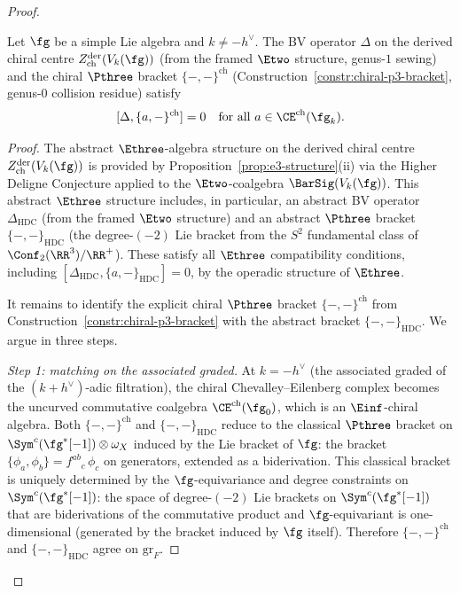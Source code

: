 \begin{proof}
\begin{lemma}
\label{lem:bv-p3-commutativity}
Let $\fg$ be a simple Lie algebra and $k \neq -h^\vee$.
The BV operator $\Delta$ on the derived chiral centre
$Z^{\mathrm{der}}_{\mathrm{ch}}(V_k(\fg))$
\textup{(}from the framed $\Etwo$ structure,
genus-$1$ sewing\textup{)} and the chiral $\Pthree$
bracket $\{-,-\}^{\mathrm{ch}}$
\textup{(}Construction~\textup{\ref{constr:chiral-p3-bracket}},
genus-$0$ collision residue\textup{)} satisfy
\begin{equation}\label{eq:bv-p3-commute}
  [\Delta, \{a,-\}^{\mathrm{ch}}] = 0
  \quad \text{for all } a \in \CE^{\mathrm{ch}}(\fg_k).
\end{equation}
\end{lemma}

\begin{proof}
The abstract $\Ethree$-algebra structure on the derived
chiral centre $Z^{\mathrm{der}}_{\mathrm{ch}}(V_k(\fg))$
is provided by Proposition~\ref{prop:e3-structure}(ii)
via the Higher Deligne Conjecture applied to the
$\Etwo$-coalgebra $\BarSig(V_k(\fg))$.
This abstract $\Ethree$ structure includes, in particular,
an abstract BV operator $\Delta_{\mathrm{HDC}}$
(from the framed $\Etwo$ structure) and an abstract
$\Pthree$ bracket $\{-,-\}_{\mathrm{HDC}}$
(the degree-$(-2)$ Lie bracket from the $S^2$ fundamental
class of $\Conf_2(\RR^3)/\RR^+$). These satisfy all
$\Ethree$ compatibility conditions, including
$[\Delta_{\mathrm{HDC}}, \{a, -\}_{\mathrm{HDC}}] = 0$,
by the operadic structure of $\Ethree$.

It remains to identify the explicit chiral $\Pthree$
bracket $\{-,-\}^{\mathrm{ch}}$ from
Construction~\ref{constr:chiral-p3-bracket} with
the abstract bracket $\{-,-\}_{\mathrm{HDC}}$. We argue
in three steps.

\textit{Step 1: matching on the associated graded.}
At $k = -h^\vee$ (the associated graded of the
$(k+h^\vee)$-adic filtration), the chiral
Chevalley--Eilenberg complex becomes the uncurved
commutative coalgebra $\CE^{\mathrm{ch}}(\fg_0)$,
which is an $\Einf$-chiral algebra.
Both $\{-,-\}^{\mathrm{ch}}$ and $\{-,-\}_{\mathrm{HDC}}$
reduce to the classical $\Pthree$ bracket on
$\Sym^c(\fg^*[-1]) \otimes \omega_X$ induced by the Lie
bracket of $\fg$: the bracket
$\{\phi_a, \phi_b\} = f^{ab}{}_c\,\phi_c$ on generators,
extended as a biderivation.
This classical bracket is uniquely determined by the
$\fg$-equivariance and degree constraints on
$\Sym^c(\fg^*[-1])$: the space of degree-$(-2)$
Lie brackets on $\Sym^c(\fg^*[-1])$ that are
biderivations of the commutative product and
$\fg$-equivariant is one-dimensional (generated by the
bracket induced by $\fg$ itself). Therefore
$\{-,-\}^{\mathrm{ch}}$ and $\{-,-\}_{\mathrm{HDC}}$
agree on $\mathrm{gr}_F$.


\end{proof}
\end{proof}
